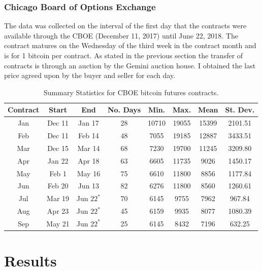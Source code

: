 \documentclass{paper}
\begin{document}
\begin{doublespacing}
\subsubsection{Chicago Board of Options Exchange}
The data was collected on the interval of the first day that the contracts were available through the CBOE (December 11, 2017) until June 22, 2018.
The contract matures on the Wednesday of the third week in the contract month and is for 1 bitcoin per contract. As stated in the previous section the transfer of contracts is through an auction by the Gemini auction house. I obtained the last price agreed upon by the buyer and seller for each day.
\begin{table}[H]
\centering
\begin{tabular}{|c | c  c | c | c | c | c | c|}\hline
Contract& Start & End & No. Days & Min. & Max. & Mean & St. Dev. \\\hline
Jan & Dec 11 & Jan 17 & 28  & 10710 & 19055 & 15399 & 2101.51 \\
Feb & Dec 11 & Feb 14 & 48  & 7055  & 19185 & 12887 & 3433.51 \\
Mar & Dec 15 & Mar 14 & 68  & 7230  & 19700 & 11245 & 3209.80 \\
Apr & Jan 22 & Apr 18 & 63  & 6605  & 11735 & 9026  & 1450.17 \\
May & Feb 1  & May 16 & 75  & 6610  & 11800 & 8856  & 1177.84 \\
Jun & Feb 20 & Jun 13 & 82  & 6276  & 11800 & 8560  & 1260.61 \\ 
Jul & Mar 19 & Jun $22^{*}$  & 70  & 6145 & 9755  & 7962  & 967.84  \\
Aug & Apr 23 & Jun $22^{*}$  & 45  & 6159 & 9935  & 8077  & 1080.39  \\
Sep & May 21 & Jun $22^{*}$  & 25  & 6145 & 8432  & 7196  & 632.25  \\\hline
\end{tabular}
\caption{Summary Statistics for CBOE bitcoin futures contracts.}\label{CBOE}
\end{table}


\section{Results}

\end{doublespacing}
\end{document}
